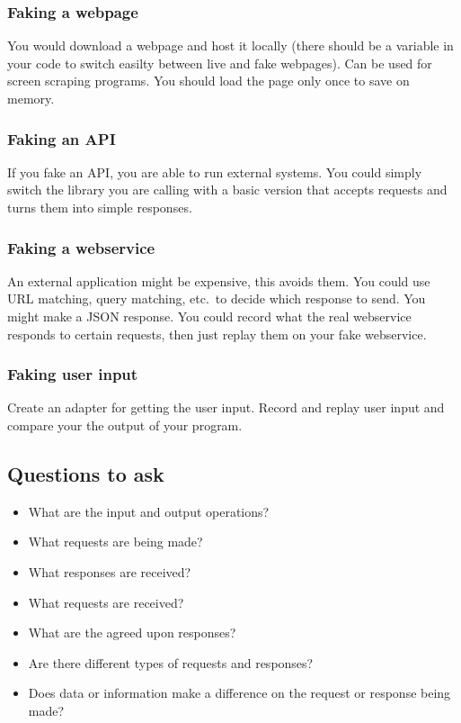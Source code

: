 \subsubsection{Faking a webpage}\label{ssub:faking_a_webpage}

You would download a webpage and host it locally (there should be a variable in your code to switch easilty between live and fake webpages).
Can be used for screen scraping programs.
You should load the page only once to save on memory.

\subsubsection{Faking an API}\label{ssub:faking_an_api}

If you fake an API, you are able to run external systems.
You could simply switch the library you are calling with a basic version that accepts requests and turns them into simple responses.

\subsubsection{Faking a webservice}\label{ssub:faking_a_webservice}

An external application might be expensive, this avoids them.
You could use URL matching, query matching, etc.\ to decide which response to send.
You might make a JSON response.
You could record what the real webservice responds to certain requests, then just replay them on your fake webservice.

\subsubsection{Faking user input}\label{ssub:faking_user_input}

Create an adapter for getting the user input.
Record and replay user input and compare your the output of your program.

\subsection{Questions to ask}\label{sub:questions_to_ask}

\begin{itemize}
    \item What are the input and output operations?
    \item What requests are being made?
    \item What responses are received?
    \item What requests are received?
    \item What are the agreed upon responses?
    \item Are there different types of requests and responses?
    \item Does data or information make a difference on the request or response being made?
\end{itemize}
